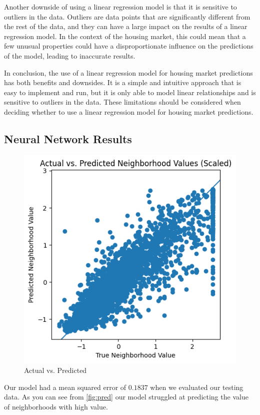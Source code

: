 \documentclass[11pt]{article}
\begin{document}
Another downside of using a linear regression model is that it is sensitive to outliers in the data. Outliers are data points that are significantly different from the rest of the data, and they can have a large impact on the results of a linear regression model. In the context of the housing market, this could mean that a few unusual properties could have a disproportionate influence on the predictions of the model, leading to inaccurate results.

In conclusion, the use of a linear regression model for housing market predictions has both benefits and downsides. It is a simple and intuitive approach that is easy to implement and run, but it is only able to model linear relationships and is sensitive to outliers in the data. These limitations should be considered when deciding whether to use a linear regression model for housing market predictions.

\subsection{Neural Network Results}

\begin{figure}[h]
\centering   
    \includegraphics[scale=.5]{predictions}
    \caption{Actual vs. Predicted}
    \label{fig:pred}
\end{figure}

Our model had a mean squared error of $0.1837$ when we evaluated our testing data. As you can see from \autoref{fig:pred} our model struggled at predicting the value of neighborhoods with high value.  
\end{document}
